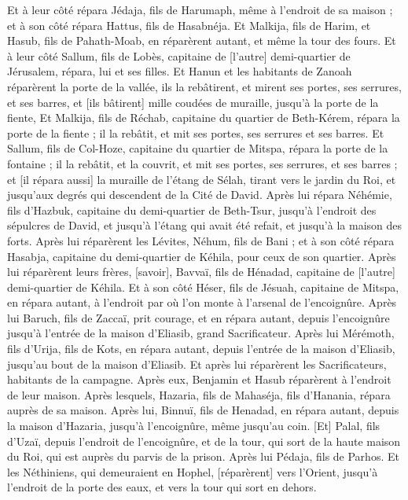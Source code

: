 \begin{multicols}{2}
Et à leur côté répara Jédaja, fils de Harumaph, même à l'endroit de sa maison ; et à son côté répara Hattus, fils de Hasabnéja.
Et Malkija, fils de Harim, et Hasub, fils de Pahath-Moab, en réparèrent autant, et même la tour des fours.
Et à leur côté Sallum, fils de Lobès, capitaine de [l'autre] demi-quartier de Jérusalem, répara, lui et ses filles.
Et Hanun et les habitants de Zanoah réparèrent la porte de la vallée, ils la rebâtirent, et mirent ses portes, ses serrures, et ses barres, et [ils bâtirent] mille coudées de muraille, jusqu'à la porte de la fiente,
Et Malkija, fils de Réchab, capitaine du quartier de Beth-Kérem, répara la porte de la fiente ; il la rebâtit, et mit ses portes, ses serrures et ses barres.
Et Sallum, fils de Col-Hoze, capitaine du quartier de Mitspa, répara la porte de la fontaine ; il la rebâtit, et la couvrit, et mit ses portes, ses serrures, et ses barres ; et [il répara aussi] la muraille de l'étang de Sélah, tirant vers le jardin du Roi, et jusqu'aux degrés qui descendent de la Cité de David.
Après lui répara Néhémie, fils d'Hazbuk, capitaine du demi-quartier de Beth-Tsur, jusqu'à l'endroit des sépulcres de David, et jusqu'à l'étang qui avait été refait, et jusqu'à la maison des forts.
Après lui réparèrent les Lévites, Néhum, fils de Bani ; et à son côté répara Hasabja, capitaine du demi-quartier de Kéhila, pour ceux de son quartier.
Après lui réparèrent leurs frères, [savoir], Bavvaï, fils de Hénadad, capitaine de [l'autre] demi-quartier de Kéhila.
Et à son côté Héser, fils de Jésuah, capitaine de Mitspa, en répara autant, à l'endroit par où l'on monte à l'arsenal de l'encoignûre.
Après lui Baruch, fils de Zaccaï, prit courage, et en répara autant, depuis l'encoignûre jusqu'à l'entrée de la maison d'Eliasib, grand Sacrificateur.
Après lui Mérémoth, fils d'Urija, fils de Kots, en répara autant, depuis l'entrée de la maison d'Eliasib, jusqu'au bout de la maison d'Eliasib.
Et après lui réparèrent les Sacrificateurs, habitants de la campagne.
Après eux, Benjamin et Hasub réparèrent à l'endroit de leur maison. Après lesquels, Hazaria, fils de Mahaséja, fils d'Hanania, répara auprès de sa maison.
Après lui, Binnuï, fils de Henadad, en répara autant, depuis la maison d'Hazaria, jusqu'à l'encoignûre, même jusqu'au coin.
[Et] Palal, fils d'Uzaï, depuis l'endroit de l'encoignûre, et de la tour, qui sort de la haute maison du Roi, qui est auprès du parvis de la prison. Après lui Pédaja, fils de Parhos.
Et les Néthiniens, qui demeuraient en Hophel, [réparèrent] vers l'Orient, jusqu'à l'endroit de la porte des eaux, et vers la tour qui sort en dehors.

\end{multicols}
